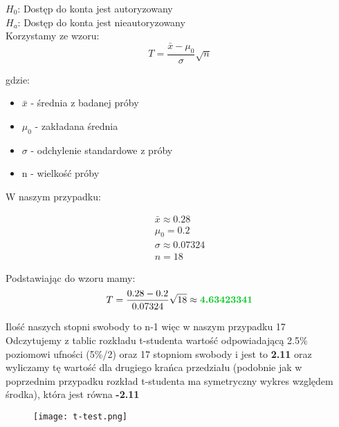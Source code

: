 \documentclass[main.tex]{subfiles}
\begin{document}
    $H_{0}$: Dostęp do konta jest autoryzowany \\

    $H_{a}$: Dostęp do konta jest nieautoryzowany \\

    Korzystamy ze wzoru:
    \begin{equation*}
        T = \frac{\bar{x} - \mu_{0}}{\sigma}\sqrt{n}
    \end{equation*}

    gdzie:
    \begin{itemize}
        \item $\bar{x}$ - średnia z badanej próby
        \item $\mu_{0}$ - zakładana średnia
        \item $\sigma$ - odchylenie standardowe z próby
        \item n - wielkość próby
    \end{itemize}

    W naszym przypadku:

    \begin{gather}
        \bar{x} \approx 0.28 \\
        \mu_{0} = 0.2 \\
        \sigma \approx 0.07324 \\
        n = 18
    \end{gather}

    Podstawiając do wzoru mamy:
    \begin{equation*}
        T = \frac{0.28 - 0.2}{0.07324}\sqrt{18} \approx \textbf{\color[HTML]{00ca1f}4.63423341}
    \end{equation*}

    Ilość naszych stopni swobody to n-1 więc w naszym przypadku 17 \\

    Odczytujemy z tablic rozkładu t-studenta wartość odpowiadającą 2.5\% poziomowi ufności (5\%/2) oraz 17 stopniom swobody i jest to \textbf{\color[HTML]{b30eff}2.11} oraz wyliczamy tę wartość dla drugiego krańca przedziału (podobnie jak w poprzednim przypadku rozkład t-studenta ma symetryczny wykres względem środka), która jest równa \textbf{\color[HTML]{b30eff}-2.11} \\

    \begin{figure}[H]
        \center
        \texttt{[image: t-test.png]}
    \end{figure}
\end{document}
